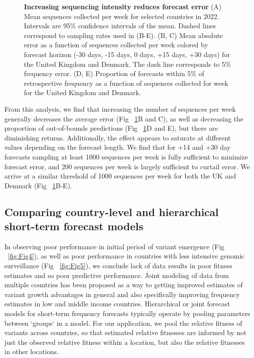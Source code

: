\documentclass[10pt,letterpaper]{article}
\begin{document}
\begin{figure}[tb!]
    \centering
    \caption{
			\textbf{Increasing sequencing intensity reduces forecast error}
    	(A) Mean sequences collected per week for selected countries in 2022.
			Intervals are 95\% confidence intervals of the mean.
			Dashed lines correspond to sampling rates used in (B-E).
    	(B, C) Mean absolute error as a function of sequences collected per week colored by forecast horizon (-30 days, -15 days, 0 days, +15 days, +30 days) for the United Kingdom and Denmark.
			The dash line corresponds to 5\% frequency error.
    	(D, E) Proportion of forecasts within 5\% of retrospective frequency as a function of sequences collected for week for the United Kingdom and Denmark.
  	}
    \label{fig:Fig6}
\end{figure}


From this analysis, we find that increasing the number of sequences per week generally decreases the average error (Fig ~\ref{fig:Fig6}B and C), as well as decreasing the proportion of out-of-bounds predictions (Fig ~\ref{fig:Fig6}D and E), but there are diminishing returns.
Additionally, the effect appears to saturate at different values depending on the forecast length.
We find that for +14 and +30 day forecasts sampling at least 1000 sequences per week is fully sufficient to minimize forecast error, and 200 sequences per week is largely sufficient to curtail error.
We arrive at a similar threshold of 1000 sequences per week for both the UK and Denmark (Fig ~\ref{fig:Fig6}B-E).


\subsection*{Comparing country-level and hierarchical short-term forecast models}

In observing poor performance in initial period of variant emergence (Fig \ \ref{fig:Fig4}), as well as poor performance in countries with less intensive genomic surveillance (Fig \ \ref{fig:Fig5}), we conclude lack of data results in poor fitness estimates and so poor predictive performance.
Joint modeling of data from multiple countries has been proposed as a way to getting improved estimates of variant growth advantages in general and also specifically improving frequency estimates in low and middle income countries.
Hierarchical or joint forecast models for short-term frequency forecasts typically operate by pooling parameters between `groups` in a model.
For our application, we pool the relative fitness of variants across countries, so that estimated relative fitnesses are informed by not just the observed relative fitness within a location, but also the relative fitnesses in other locations.
\end{document}
